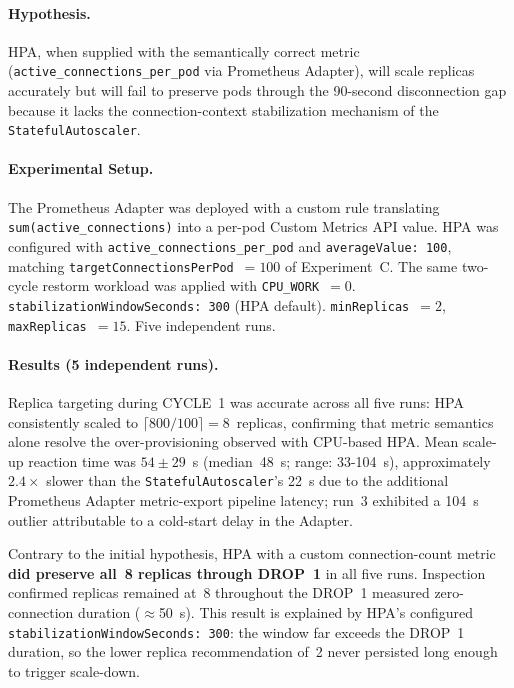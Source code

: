 \documentclass[3p,twocolumn]{elsarticle}
\theoremstyle{plain}%
\theoremstyle{definition}%
\begin{document}
\paragraph{Hypothesis.} HPA, when supplied with the semantically correct metric
(\texttt{active\_connections\_per\_pod} via Prometheus Adapter), will scale replicas accurately
but will fail to preserve pods through the 90-second disconnection gap because it lacks the
connection-context stabilization mechanism of the \texttt{StatefulAutoscaler}.

\paragraph{Experimental Setup.} The Prometheus Adapter was deployed with a custom rule
translating \texttt{sum(active\_connections)} into a per-pod Custom Metrics API value. HPA
was configured with \texttt{active\_connections\_per\_pod} and \texttt{averageValue: 100},
matching \texttt{targetConnectionsPerPod}~$= 100$ of Experiment~C. The same two-cycle
restorm workload was applied with \texttt{CPU\_WORK}~$= 0$.
\texttt{stabilizationWindowSeconds: 300} (HPA default). \texttt{minReplicas}~$= 2$,
\texttt{maxReplicas}~$= 15$. Five independent runs.

\paragraph{Results (5 independent runs).} Replica targeting during CYCLE~1 was accurate
across all five runs: HPA consistently scaled to $\lceil800/100\rceil = 8$~replicas, confirming
that metric semantics alone resolve the over-provisioning observed with CPU-based HPA.
Mean scale-up reaction time was $54 \pm 29$~s (median~48~s; range: 33-104~s),
approximately $2.4\times$ slower than the \texttt{StatefulAutoscaler}'s 22~s due to the
additional Prometheus Adapter metric-export pipeline latency; run~3 exhibited a 104~s
outlier attributable to a cold-start delay in the Adapter.

Contrary to the initial hypothesis, HPA with a custom connection-count metric \textbf{did
preserve all~8 replicas through DROP~1} in all five runs. Inspection confirmed replicas
remained at~8 throughout the DROP~1 measured zero-connection duration ($\approx$50~s).
This result is explained by HPA's configured \texttt{stabilizationWindowSeconds: 300}: the
window far exceeds the DROP~1 duration, so the lower replica recommendation of~2 never
persisted long enough to trigger scale-down.
\end{document}

